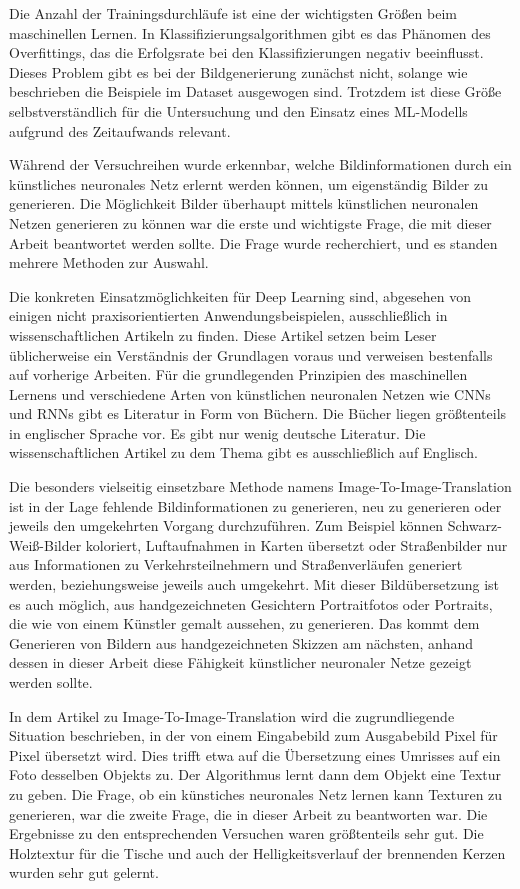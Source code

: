 Die Anzahl der Trainingsdurchläufe ist eine der wichtigsten Größen beim maschinellen Lernen. In Klassifizierungsalgorithmen gibt es das Phänomen des Overfittings, das die Erfolgsrate bei den Klassifizierungen negativ beeinflusst. Dieses Problem gibt es bei der Bildgenerierung zunächst nicht, solange wie beschrieben die Beispiele im Dataset ausgewogen sind. Trotzdem ist diese Größe selbstverständlich für die Untersuchung und den Einsatz eines ML-Modells aufgrund des Zeitaufwands relevant.

Während der Versuchreihen wurde erkennbar, welche Bildinformationen durch ein künstliches neuronales Netz erlernt werden können, um eigenständig Bilder zu generieren. Die Möglichkeit Bilder überhaupt mittels künstlichen neuronalen Netzen generieren zu können war die erste und wichtigste Frage, die mit dieser Arbeit beantwortet werden sollte. Die Frage wurde recherchiert, und es standen mehrere Methoden zur Auswahl.

Die konkreten Einsatzmöglichkeiten für Deep Learning sind, abgesehen von einigen nicht praxisorientierten Anwendungsbeispielen, ausschließlich in wissenschaftlichen Artikeln zu finden. Diese Artikel setzen beim Leser üblicherweise ein Verständnis der Grundlagen voraus und verweisen bestenfalls auf vorherige Arbeiten. Für die grundlegenden Prinzipien des maschinellen Lernens und verschiedene Arten von künstlichen neuronalen Netzen wie CNNs und RNNs gibt es Literatur in Form von Büchern. Die Bücher liegen größtenteils in englischer Sprache vor. Es gibt nur wenig deutsche Literatur. Die wissenschaftlichen Artikel zu dem Thema gibt es ausschließlich auf Englisch.

Die besonders vielseitig einsetzbare Methode namens Image-To-Image-Translation ist in der Lage fehlende Bildinformationen zu generieren, neu zu generieren oder jeweils den umgekehrten Vorgang durchzuführen. Zum Beispiel können Schwarz-Weiß-Bilder koloriert, Luftaufnahmen in Karten übersetzt oder Straßenbilder nur aus Informationen zu Verkehrsteilnehmern und Straßenverläufen generiert werden, beziehungsweise jeweils auch umgekehrt. Mit dieser Bildübersetzung ist es auch möglich, aus handgezeichneten Gesichtern Portraitfotos oder Portraits, die wie von einem Künstler gemalt aussehen, zu generieren. Das kommt dem Generieren von Bildern aus handgezeichneten Skizzen am nächsten, anhand dessen in dieser Arbeit diese Fähigkeit künstlicher neuronaler Netze gezeigt werden sollte.

In dem Artikel zu Image-To-Image-Translation wird die zugrundliegende Situation beschrieben, in der von einem Eingabebild zum Ausgabebild Pixel für Pixel übersetzt wird. Dies trifft etwa auf die Übersetzung eines Umrisses auf ein Foto desselben Objekts zu. Der Algorithmus lernt dann dem Objekt eine Textur zu geben. Die Frage, ob ein künstiches neuronales Netz lernen kann Texturen zu generieren, war die zweite Frage, die in dieser Arbeit zu beantworten war. Die Ergebnisse zu den entsprechenden Versuchen waren größtenteils sehr gut. Die Holztextur für die Tische und auch der Helligkeitsverlauf der brennenden Kerzen wurden sehr gut gelernt.


